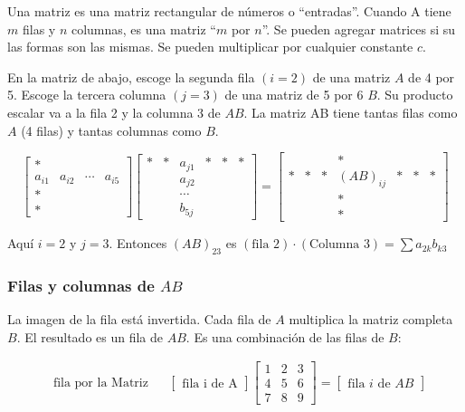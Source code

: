 Una matriz es una matriz rectangular de números o ``entradas''. Cuando
A tiene $m$ filas y $n$ columnas, es una matriz ``$m$ por $n$''. Se pueden agregar matrices si su
las formas son las mismas. Se pueden multiplicar por cualquier constante $c$.

En la matriz de abajo, escoge la segunda fila $(i = 2)$ de una matriz $A$ de 4 por 5. Escoge la tercera
columna $(j = 3)$ de una matriz de 5 por 6 $B$. Su producto escalar va a la fila 2 y la columna 3
de $AB$. La matriz AB tiene tantas filas como $A$ (4 filas) y tantas columnas como $B$.

\begin{equation*}
	\begin{bmatrix}
		* &  &  & \\a_{i1}&a_{i2}&\cdots&a_{i5}\\*&&&\\*&&&
	\end{bmatrix} \begin{bmatrix}
		* & * & a_{j1} & * & * & * \\&&a_{j2}&&&\\&&\cdots&&&\\&&b_{5j}&&&
	\end{bmatrix}= \begin{bmatrix}
		 &  &  & * &  & \\*&*&*&(AB)_{ij}&*&*&*\\& &&*&&\\&&&*&&
	\end{bmatrix}
\end{equation*}

Aquí $i = 2$ y $j = 3$. Entonces $(AB)_{23}$ es $(\text{fila 2})\cdot (\text{Columna 3}) = \sum a_{2k}b_{k3}$

\subsubsection{Filas y columnas de $AB$}

La imagen de la fila está invertida. Cada fila de $A$ multiplica la matriz completa $B$. El resultado es un
fila de $AB$. Es una combinación de las filas de $B$:

\begin{align*}
	 & \text{fila por la Matriz} &  & \begin{bmatrix}
		                                  \text{fila i de A} \end{bmatrix}\begin{bmatrix}
		                                                                  1 & 2 & 3 \\4&5&6\\7&8&9
	                                                                  \end{bmatrix}=\begin{bmatrix}
		                                                                                \text{fila $i$ de $AB$} \end{bmatrix}
\end{align*}

